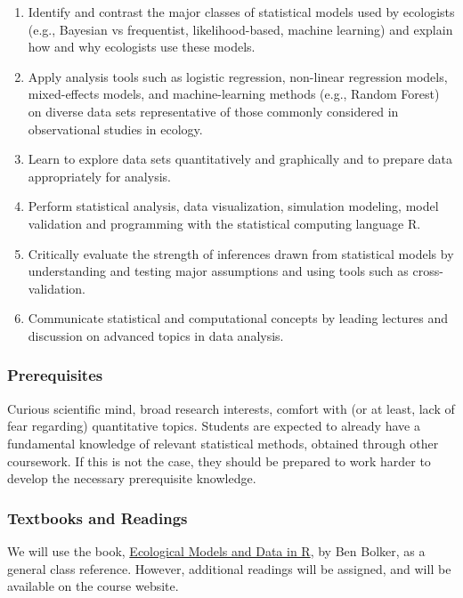 \documentclass[]{article}
\providecommand{\tightlist}{%
  \setlength{\itemsep}{0pt}\setlength{\parskip}{0pt}}
\begin{document}
\begin{enumerate}
\def\labelenumi{\arabic{enumi}.}
\tightlist
\item
  Identify and contrast the major classes of statistical models used by
  ecologists (e.g., Bayesian vs frequentist, likelihood-based, machine
  learning) and explain how and why ecologists use these models.
\item
  Apply analysis tools such as logistic regression, non-linear
  regression models, mixed-effects models, and machine-learning methods
  (e.g., Random Forest) on diverse data sets representative of those
  commonly considered in observational studies in ecology.
\item
  Learn to explore data sets quantitatively and graphically and to
  prepare data appropriately for analysis.
\item
  Perform statistical analysis, data visualization, simulation modeling,
  model validation and programming with the statistical computing
  language R.
\item
  Critically evaluate the strength of inferences drawn from statistical
  models by understanding and testing major assumptions and using tools
  such as cross-validation.
\item
  Communicate statistical and computational concepts by leading lectures
  and discussion on advanced topics in data analysis.
\end{enumerate}

\subsubsection{Prerequisites}\label{prerequisites}

Curious scientific mind, broad research interests, comfort with (or at
least, lack of fear regarding) quantitative topics. Students are
expected to already have a fundamental knowledge of relevant statistical
methods, obtained through other coursework. If this is not the case,
they should be prepared to work harder to develop the necessary
prerequisite knowledge.

\subsubsection{Textbooks and Readings}\label{textbooks-and-readings}

We will use the book,
\href{https://ms.mcmaster.ca/~bolker/emdbook/}{Ecological Models and
Data in R}, by Ben Bolker, as a general class reference. However,
additional readings will be assigned, and will be available on the
course website.
\end{document}
